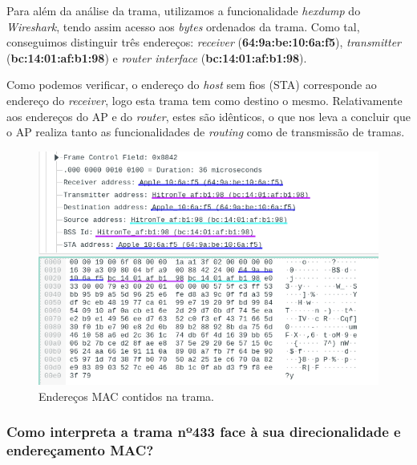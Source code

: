     \par Para além da análise da trama, utilizamos a funcionalidade \textit{hexdump} do \textit{Wireshark}, tendo assim acesso aos \textit{bytes} ordenados da trama. Como tal, conseguimos distinguir três endereços: \textit{receiver} (\textbf{64:9a:be:10:6a:f5}), \textit{transmitter} (\textbf{bc:14:01:af:b1:98}) e \textit{router interface} (\textbf{bc:14:01:af:b1:98}).

    \par Como podemos verificar, o endereço do \textit{host} sem fios (STA) corresponde ao endereço do \textit{receiver}, logo esta trama tem como destino o mesmo. Relativamente aos endereços do AP e do \textit{router}, estes são idênticos, o que nos leva a concluir que o AP realiza tanto as funcionalidades de \textit{routing} como de transmissão de tramas.
    
    \begin{figure}[H]
    \centering
    \includegraphics[width=350pt]{Prints/Questao7/questao7-B-1.png}
    \caption{Endereços MAC contidos na trama.} \label{questao7-2-enderecos}
    \end{figure}




    





\subsubsection{Como interpreta a trama nº433 face à sua direcionalidade e endereçamento MAC?}

